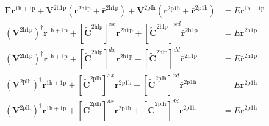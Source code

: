 \begin{align}
\bm{F} \bm{r}^{1\mathrm{h}+1\mathrm{p}} + \bm{V}^{2\mathrm{h}1\mathrm{p}} \left(\bm{r}^{2\mathrm{h}1\mathrm{p}} + \bm{\bar{r}}^{2\mathrm{h}1\mathrm{p}}\right) + \bm{V}^{2\mathrm{plh}} \left(\bm{r}^{2\mathrm{p}1\mathrm{h}} + \bm{\bar{r}}^{2\mathrm{p}1\mathrm{h}}\right) &= E \bm{r}^{1\mathrm{h}+1\mathrm{p}} \\
\left(\bm{V}^{2\mathrm{h}1\mathrm{p}}\right)^\dagger \bm{r}^{1\mathrm{h}+1\mathrm{p}} + [\bm{\tilde{C}}^{2\mathrm{hlp}}]^{xx}\bm{r}^{2\mathrm{h}1\mathrm{p}}+ [\bm{\tilde{C}}^{2\mathrm{hlp}}]^{xd}\bm{\bar{r}}^{2\mathrm{h}1\mathrm{p}} &= E \bm{r}^{2\mathrm{h}1\mathrm{p}} \\
\left(\bm{V}^{2\mathrm{h}1\mathrm{p}}\right)^\dagger \bm{r}^{1\mathrm{h}+1\mathrm{p}} + [\bm{\tilde{C}}^{2\mathrm{hlp}}]^{dx}\bm{r}^{2\mathrm{h}1\mathrm{p}}+ [\bm{\tilde{C}}^{2\mathrm{hlp}}]^{dd}\bm{\bar{r}}^{2\mathrm{h}1\mathrm{p}} &= E \bm{\bar{r}}^{2\mathrm{h}1\mathrm{p}} \\
\left(\bm{V}^{2\mathrm{plh}}\right)^\dagger \bm{r}^{1\mathrm{h}+1\mathrm{p}} + [\bm{\tilde{C}}^{2\mathrm{plh}}]^{xx}\bm{r}^{2\mathrm{p}1\mathrm{h}}+ [\bm{\tilde{C}}^{2\mathrm{plh}}]^{xd}\bm{\bar{r}}^{2\mathrm{p}1\mathrm{h}} &= E \bm{r}^{2\mathrm{p}1\mathrm{h}} \\
\left(\bm{V}^{2\mathrm{plh}}\right)^\dagger \bm{r}^{1\mathrm{h}+1\mathrm{p}} + [\bm{\tilde{C}}^{2\mathrm{plh}}]^{dx}\bm{r}^{2\mathrm{p}1\mathrm{h}}+ [\bm{\tilde{C}}^{2\mathrm{plh}}]^{dd}\bm{\bar{r}}^{2\mathrm{p}1\mathrm{h}} &= E \bm{\bar{r}}^{2\mathrm{p}1\mathrm{h}}
\end{align}
